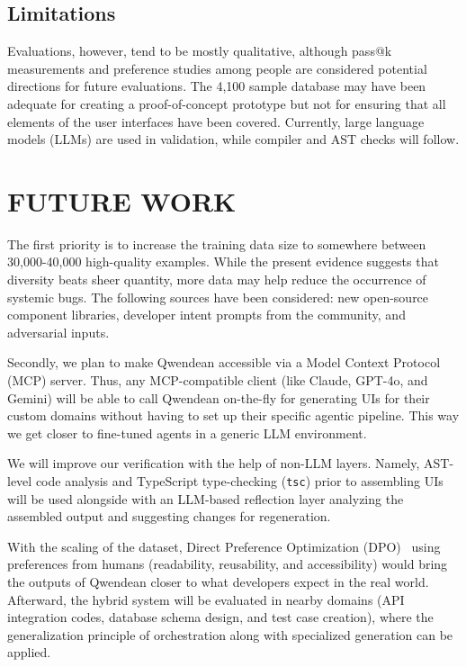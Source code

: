 \documentclass[conference]{IEEEtran}
\begin{document}
\subsection{Limitations}
Evaluations, however, tend to be mostly qualitative, although pass@k measurements and preference studies among people are considered potential directions for future evaluations. The 4,100 sample database may have been adequate for creating a proof-of-concept prototype but not for ensuring that all elements of the user interfaces have been covered. Currently, large language models (LLMs) are used in validation, while compiler and AST checks will follow.

\section{FUTURE WORK}

The first priority is to increase the training data size to somewhere between 30,000-40,000 high-quality examples. While the present evidence suggests that diversity beats sheer quantity, more data may help reduce the occurrence of systemic bugs. The following sources have been considered: new open-source component libraries, developer intent prompts from the community, and adversarial inputs.

Secondly, we plan to make Qwendean accessible via a Model Context Protocol (MCP) server. Thus, any MCP-compatible client (like Claude, GPT-4o, and Gemini) will be able to call Qwendean on-the-fly for generating UIs for their custom domains without having to set up their specific agentic pipeline. This way we get closer to fine-tuned agents in a generic LLM environment.

We will improve our verification with the help of non-LLM layers. Namely, AST-level code analysis and TypeScript type-checking (\texttt{tsc}) prior to assembling UIs will be used alongside with an LLM-based reflection layer analyzing the assembled output and suggesting changes for regeneration.

With the scaling of the dataset, Direct Preference Optimization (DPO)~\cite{ref7} using preferences from humans (readability, reusability, and accessibility) would bring the outputs of Qwendean closer to what developers expect in the real world. Afterward, the hybrid system will be evaluated in nearby domains (API integration codes, database schema design, and test case creation), where the generalization principle of orchestration along with specialized generation can be applied.
\end{document}
